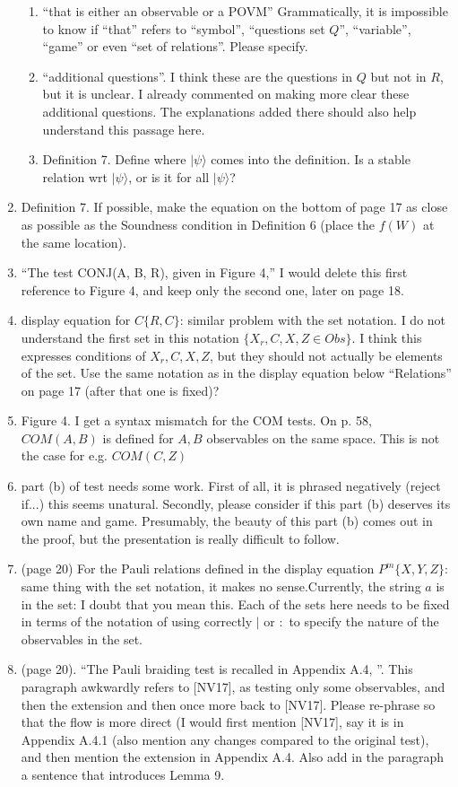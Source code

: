 \documentclass[12pt]{article}
\begin{document}
\begin{enumerate}
\begin{enumerate}
\item ``that is either an observable or a POVM'' Grammatically, it is impossible to know if ``that'' refers to ``symbol'', ``questions set $Q$'', ``variable'', ``game'' or even ``set of relations''. Please specify.
\item ``additional questions''.   I think these are the questions in $Q$ but not in $R$, but it is unclear. I already commented on making more clear these additional questions. The explanations added there should also help understand this passage here.
    \item Definition 7. Define where $|\psi\rangle$ comes into the definition. Is a stable relation wrt $|\psi\rangle$, or is it for all $|\psi\rangle$?
\end{enumerate}
  \item Definition 7. If possible, make the equation on the bottom of page 17 as close as possible as the Soundness condition in Definition 6 (place the $f(W)$ at the same location).
      \item ``The test
CONJ(A, B, R), given in Figure 4,'' I would delete this first reference to Figure 4, and keep only the second one, later on page 18.
  \item display equation for $C\{R,C\}$: similar problem with the set notation. I do not understand the first set in this notation $\{X_r, C, X, Z \in Obs\}$. I think this expresses conditions of $X_r, C, X, Z$, but they should not actually be elements of the set. Use the same notation as in the display equation below ``Relations'' on page 17 (after that one is fixed)?
   \item Figure 4. I get a syntax mismatch for the COM tests. On p. 58, $COM(A,B)$ is defined for $A,B$ observables on the same space. This is not the case for e.g. $COM(C,Z)$
     \item part (b) of test needs some work. First of all, it is phrased negatively (reject if...) this seems unatural. Secondly, please consider if this part (b) deserves its own name and game. Presumably, the beauty of this part (b) comes out in the proof, but the presentation is really difficult to follow.
   \item (page 20) For the Pauli relations defined in the display equation $P^m\{X,Y,Z\}$: same thing with the set notation, it makes no sense.Currently, the string $a$ is in the set: I doubt that you mean this. Each of the sets here needs to be fixed in terms of the notation of using correctly $\mid$ or $:$ to specify the nature of the observables in the set.
    \item (page 20). ``The Pauli braiding test is recalled in Appendix A.4, ''. This paragraph awkwardly refers to [NV17], as testing only some observables, and then the extension and then once more back to [NV17]. Please re-phrase so that the flow is more direct (I would first mention [NV17], say it is in Appendix A.4.1 (also mention any changes compared to the original test), and then mention the extension in Appendix A.4. Also add in the paragraph a sentence that introduces Lemma 9.

\end{enumerate}
\end{document}
